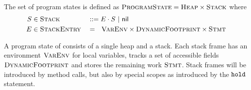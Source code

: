The set of program states is defined as $\textup{\textsc{ProgramState}} = \textup{\textsc{Heap}} \times \textup{\textsc{Stack}}$ where
\begin{align*}
	S & \in \textup{\textsc{Stack}}      &  & ::= E \cdot S ~|~ \textup{\textsf{nil}}                               \\
	E & \in \textup{\textsc{StackEntry}} &  & =~~ \textup{\textsc{VarEnv}} \times \textup{\textsc{DynamicFootprint}} \times \textup{\textsc{Stmt}}
\end{align*}

A program state of \svlidf consists of a single heap and a stack.
Each stack frame has an environment $\textup{\textsc{VarEnv}}$ for local variables, tracks a set of accessible fields $\textup{\textsc{DynamicFootprint}}$ and stores the remaining work $\textup{\textsc{Stmt}}$.
Stack frames will be introduced by method calls, but also by special scopes as introduced by the $\textup{\texttt{hold}}$ statement.

\begin{comment}
REQUIRED?
\begin{definition}[Topmost Stack Entry]
    Let $\topmost : \setStack \rightharpoonup \setStackEntry$ be defined as
    \begin{align*}
    &\topmost(E \cdot S) = E\\
    &\topmost(\nil) \quad\textit{ undefined}
    \end{align*}
\end{definition}

Program states with scheduled statement $s$ are defined as
\begin{displaymath}
\setProgramState_s ~\defeq~ \setHeap ~\times~ \{~~ (\rho, A_d, s) \cdot S ~~|~~ \rho \in \setVarEnv,~ A_d \in \setDFootprint,~ S \in \setStack ~~\}
\end{displaymath}
\end{comment}